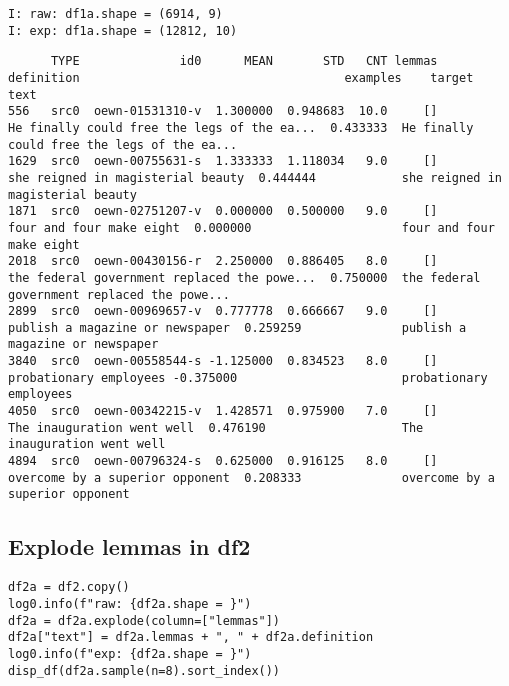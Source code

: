 \documentclass[a4paper,10pt,onecolumn,oneside,openright]{article}
\begin{document}
\begin{verbatim}
I: raw: df1a.shape = (6914, 9)
I: exp: df1a.shape = (12812, 10)
\end{verbatim}
\begin{verbatim}
      TYPE              id0      MEAN       STD   CNT lemmas definition                                     examples    target                                         text
556   src0  oewn-01531310-v  1.300000  0.948683  10.0     []             He finally could free the legs of the ea...  0.433333  He finally could free the legs of the ea...
1629  src0  oewn-00755631-s  1.333333  1.118034   9.0     []                       she reigned in magisterial beauty  0.444444            she reigned in magisterial beauty
1871  src0  oewn-02751207-v  0.000000  0.500000   9.0     []                                four and four make eight  0.000000                     four and four make eight
2018  src0  oewn-00430156-r  2.250000  0.886405   8.0     []             the federal government replaced the powe...  0.750000  the federal government replaced the powe...
2899  src0  oewn-00969657-v  0.777778  0.666667   9.0     []                         publish a magazine or newspaper  0.259259              publish a magazine or newspaper
3840  src0  oewn-00558544-s -1.125000  0.834523   8.0     []                                  probationary employees -0.375000                       probationary employees
4050  src0  oewn-00342215-v  1.428571  0.975900   7.0     []                              The inauguration went well  0.476190                   The inauguration went well
4894  src0  oewn-00796324-s  0.625000  0.916125   8.0     []                         overcome by a superior opponent  0.208333              overcome by a superior opponent
\end{verbatim}
\subsection{Explode lemmas in df2}
\label{sec:orgeeeb8b8}
\begin{verbatim}
df2a = df2.copy()
log0.info(f"raw: {df2a.shape = }")
df2a = df2a.explode(column=["lemmas"])
df2a["text"] = df2a.lemmas + ", " + df2a.definition
log0.info(f"exp: {df2a.shape = }")
disp_df(df2a.sample(n=8).sort_index())
\end{verbatim}
\end{document}
